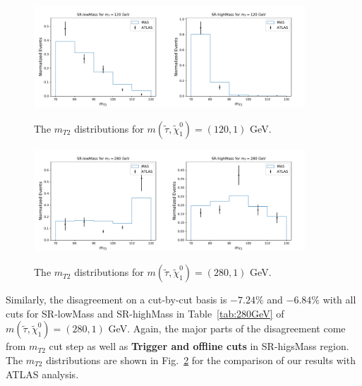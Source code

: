 \documentclass{ws-mpla}
\begin{document}
\begin{figure}[h!]
  \centerline{\includegraphics[width=2.0in]{m120_SRlow}\includegraphics[width=2.0in]{m120_SRhigh}}
  \vspace*{8pt}
  \caption{The $m_{T2}$ distributions for $m(\tilde{\tau},\tilde{\chi}^0_1)=(120,1)$ GeV.\protect\label{fig:m120_norm}}
\end{figure}

\begin{figure}[t]
  \centerline{\includegraphics[width=2.0in]{m280_SRlow}\includegraphics[width=2.0in]{m280_SRhigh}}
  \vspace*{8pt}
  \caption{The $m_{T2}$ distributions for $m(\tilde{\tau},\tilde{\chi}^0_1)=(280,1)$ GeV.\protect\label{fig:m280_norm}}
\end{figure}

Similarly, the disagreement on a cut-by-cut basis is $-7.24\%$ and $-6.84\%$ with all cuts for SR-lowMass and SR-highMass in Table~\ref{tab:280GeV} of $m(\tilde{\tau},\tilde{\chi}^0_1)=(280,1)$ GeV. Again, the major parts of the disagreement come from $m_{T2}$ cut step as well as \textbf{Trigger and offline cuts} in SR-higsMass region.
The $m_{T2}$ distributions are shown in Fig.~\ref{fig:m280_norm} for the comparison of our results with ATLAS analysis.
\end{document}
